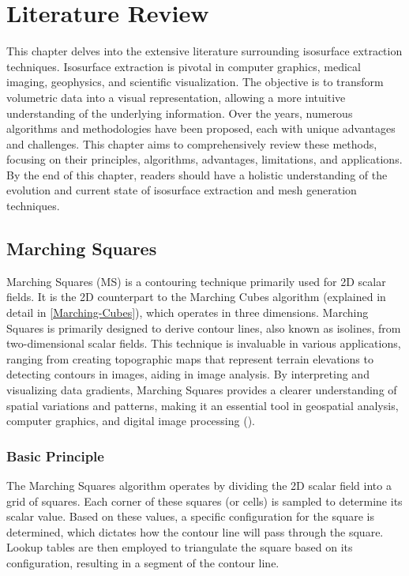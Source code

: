 \chapter{Literature Review}  \label{Chapter3} 
This chapter delves into the extensive literature surrounding isosurface extraction techniques. Isosurface extraction is pivotal in computer graphics, medical imaging, geophysics, and scientific visualization. The objective is to transform volumetric data into a visual representation, allowing a more intuitive understanding of the underlying information. Over the years, numerous algorithms and methodologies have been proposed, each with unique advantages and challenges. This chapter aims to comprehensively review these methods, focusing on their principles, algorithms, advantages, limitations, and applications. By the end of this chapter, readers should have a holistic understanding of the evolution and current state of isosurface extraction and mesh generation techniques.

\section{Marching Squares} \label{Marching-Squares}

Marching Squares (MS) is a contouring technique primarily used for 2D scalar fields. It is the 2D counterpart to the Marching Cubes algorithm (explained in detail in \ref{Marching-Cubes}), which operates in three dimensions. Marching Squares is primarily designed to derive contour lines, also known as isolines, from two-dimensional scalar fields. This technique is invaluable in various applications, ranging from creating topographic maps that represent terrain elevations to detecting contours in images, aiding in image analysis. By interpreting and visualizing data gradients, Marching Squares provides a clearer understanding of spatial variations and patterns, making it an essential tool in geospatial analysis, computer graphics, and digital image processing (\cite{Maple_2003}).

\vspace{2mm}
\subsection{Basic Principle}

The Marching Squares algorithm operates by dividing the 2D scalar field into a grid of squares. Each corner of these squares (or cells) is sampled to determine its scalar value. Based on these values, a specific configuration for the square is determined, which dictates how the contour line will pass through the square. Lookup tables are then employed to triangulate the square based on its configuration, resulting in a segment of the contour line.

